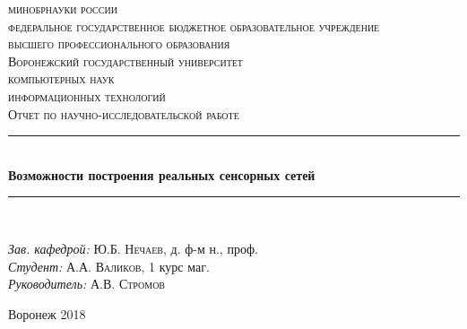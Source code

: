 \documentclass[bibliography=totocnumbered]{scrartcl}
\begin{document}
\begin{titlepage}
\newcommand{\HRule}{\rule{\linewidth}{0.5mm}} %

\center %
 
\textsc {
\footnotesize{
минобрнауки россии\\
федеральное государственное бюджетное образовательное учреждение\\
высшего профессионального образования}\\
\large{Воронежский государственный университет}
}\\[1.0cm] %


\textsc{ компьютерных наук}\\ %
\textsc{ информационных технологий}\\[1.0cm] 
\textsc{\Large Отчет по научно-исследовательской работе}\\[0.5cm] %



\HRule \\[0.4cm]
{ \huge \bfseries Возможности построения реальных сенсорных сетей}\\[0.4cm] %
\HRule \\[1.5cm]
 


\begin{flushleft} \large
\emph{Зав. кафедрой:} Ю.Б. \textsc{Нечаев}, д. ф-м н., проф.\\
\emph{Студент:} А.А. \textsc{Валиков}, 1 курс маг. \\ %
\emph{Руководитель:} А.В. \textsc{Стромов} %
\end{flushleft}

\begin{center}
Воронеж 2018
\end{center}
\end{titlepage}
\end{document}
